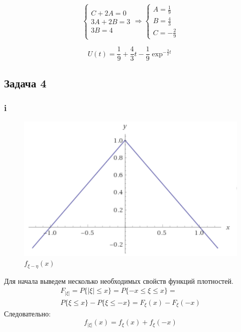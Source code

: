 \documentclass[a4paper,12pt]{article}
\begin{document}
\begin{equation}
\left\{ \begin{array} { l } { C + 2 A = 0 } \\ { 3 A + 2 B = 3 } \\ { 3 B = 4 } \end{array} \Rightarrow \left\{ \begin{array} { l } { A = \frac { 1 } { 9 } } \\ { B = \frac { 4 } { 3 } } \\ { C = - \frac { 2 } { 9 } } \end{array} \right. \right.
\end{equation}


\[ U(t) = \frac{1}{9} + \frac{4}{3}t - \frac{1}{9}\exp^{-\frac{3}{2}t}\]

\subsection{Задача 4}
\subsubsection{i}

\begin{figure}
	\includegraphics[width=\linewidth]{13}
	\caption{$  f_{\xi - \eta}(x) $}
	\label{minmax}
\end{figure}


Для начала выведем несколько необходимых свойств функций плотностей.
\begin{equation}
\begin{aligned}
F_{|\xi|} = P\{|\xi| \le x\}  = P\{-x \le \xi \le x \} =\\ P\{\xi \le x \} - P\{\xi \le -x \} = F_\xi(x) - F_\xi(-x) 
\end{aligned}
\end{equation}
Следовательно:
\[ f_{|\xi|}(x) = f_\xi(x) + f_\xi(-x) \] 
\end{document}
